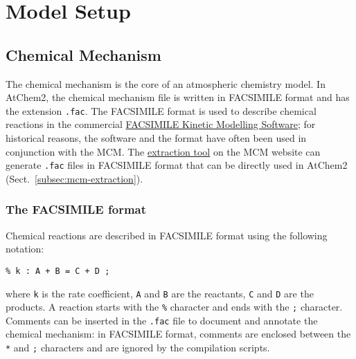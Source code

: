%
%
%
%

\chapter{Model Setup} \label{ch:setup}

\section{Chemical Mechanism} \label{sec:chemical-mechanism}

The chemical mechanism is the core of an atmospheric chemistry
model. In AtChem2, the chemical mechanism file is written in FACSIMILE
format and has the extension \texttt{.fac}. The FACSIMILE format is
used to describe chemical reactions in the commercial
\href{http://www.mcpa-software.com/}{FACSIMILE Kinetic Modelling Software};
for historical reasons, the software and the format have often
been used in conjunction with the MCM. The
\href{http://mcm.leeds.ac.uk/MCM/extract.htt}{extraction tool} on the
MCM website can generate \texttt{.fac} files in FACSIMILE format that
can be directly used in AtChem2 (Sect.~\ref{subsec:mcm-extraction}).

\subsection{The FACSIMILE format} \label{subsec:facsimile-format}

Chemical reactions are described in FACSIMILE format using the
following notation:

\begin{verbatim}
% k : A + B = C + D ;
\end{verbatim}

where \texttt{k} is the rate coefficient, \texttt{A} and \texttt{B}
are the reactants, \texttt{C} and \texttt{D} are the products. A
reaction starts with the \texttt{\%} character and ends with the
\texttt{;} character. Comments can be inserted in the \texttt{.fac}
file to document and annotate the chemical mechanism: in FACSIMILE
format, comments are enclosed between the \texttt{*} and \texttt{;}
characters and are ignored by the compilation scripts.

